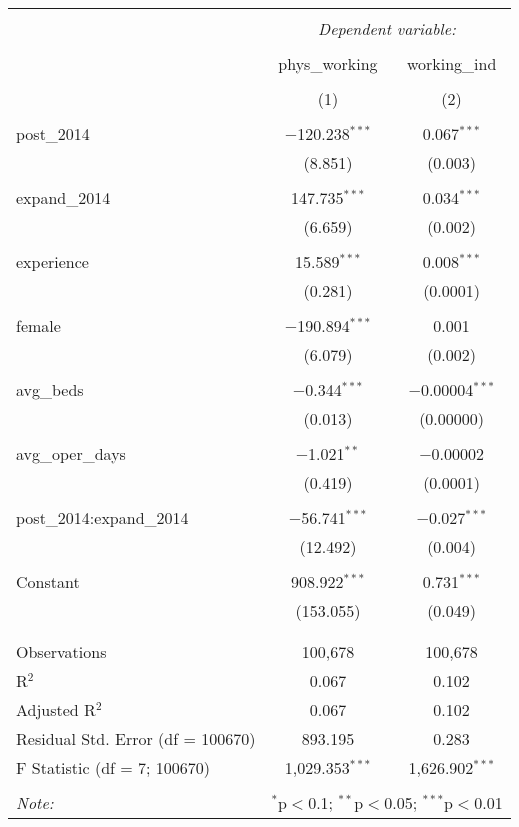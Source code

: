 
\begin{table}[!htbp] \centering 
  \caption{} 
  \label{} 
\begin{tabular}{@{\extracolsep{5pt}}lcc} 
\\[-1.8ex]\hline 
\hline \\[-1.8ex] 
 & \multicolumn{2}{c}{\textit{Dependent variable:}} \\ 
\cline{2-3} 
\\[-1.8ex] & phys\_working & working\_ind \\ 
\\[-1.8ex] & (1) & (2)\\ 
\hline \\[-1.8ex] 
 post\_2014 & $-$120.238$^{***}$ & 0.067$^{***}$ \\ 
  & (8.851) & (0.003) \\ 
  & & \\ 
 expand\_2014 & 147.735$^{***}$ & 0.034$^{***}$ \\ 
  & (6.659) & (0.002) \\ 
  & & \\ 
 experience & 15.589$^{***}$ & 0.008$^{***}$ \\ 
  & (0.281) & (0.0001) \\ 
  & & \\ 
 female & $-$190.894$^{***}$ & 0.001 \\ 
  & (6.079) & (0.002) \\ 
  & & \\ 
 avg\_beds & $-$0.344$^{***}$ & $-$0.00004$^{***}$ \\ 
  & (0.013) & (0.00000) \\ 
  & & \\ 
 avg\_oper\_days & $-$1.021$^{**}$ & $-$0.00002 \\ 
  & (0.419) & (0.0001) \\ 
  & & \\ 
 post\_2014:expand\_2014 & $-$56.741$^{***}$ & $-$0.027$^{***}$ \\ 
  & (12.492) & (0.004) \\ 
  & & \\ 
 Constant & 908.922$^{***}$ & 0.731$^{***}$ \\ 
  & (153.055) & (0.049) \\ 
  & & \\ 
\hline \\[-1.8ex] 
Observations & 100,678 & 100,678 \\ 
R$^{2}$ & 0.067 & 0.102 \\ 
Adjusted R$^{2}$ & 0.067 & 0.102 \\ 
Residual Std. Error (df = 100670) & 893.195 & 0.283 \\ 
F Statistic (df = 7; 100670) & 1,029.353$^{***}$ & 1,626.902$^{***}$ \\ 
\hline 
\hline \\[-1.8ex] 
\textit{Note:}  & \multicolumn{2}{r}{$^{*}$p$<$0.1; $^{**}$p$<$0.05; $^{***}$p$<$0.01} \\ 
\end{tabular} 
\end{table} 

